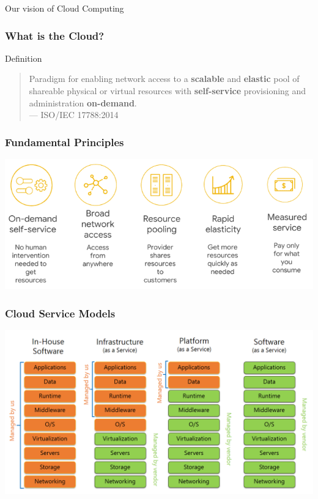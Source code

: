 \documentclass[10pt,aspectratio=1609]{beamer}
\begin{document}
\begin{section}{Our vision of Cloud Computing}
  \begin{frame}
    \frametitle{What is the Cloud?}
      \begin{alertblock}{Definition}
      \begin{quote}
        Paradigm for enabling network access to a \textbf<2>{scalable} and \textbf<2>{elastic} pool of shareable physical
        or virtual resources with \textbf<2>{self-service} provisioning and administration \textbf<2>{on-demand}.
        \\
        --- ISO/IEC 17788:2014
      \end{quote}
    \end{alertblock}

  \end{frame}

  \begin{frame}
    \frametitle{Fundamental Principles}
    \centering
    \vfill
    \includegraphics[width=\textwidth]{cloud-fundamentals.png}
  \end{frame}

\begin{frame}
  \frametitle{Cloud Service Models}
  \centering
  \vfill
  \includegraphics[width=\textwidth]{saas.png}
\end{frame}


\end{section}
\end{document}
